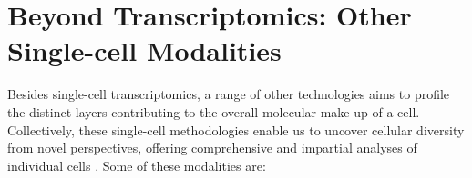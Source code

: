 \section[Beyond Transcriptomics: Other Single-cell Modalities]{Beyond Transcriptomics: Other Single-cell Modalities}
\label{sec:scrna_modalities}

Besides single-cell transcriptomics, a range of other technologies aims to profile the distinct layers contributing to the overall molecular make-up of a cell. Collectively, these single-cell methodologies enable us to uncover cellular diversity from novel perspectives, offering comprehensive and impartial analyses of individual cells \textbf{\cite{stein_single-cell_2021}}. Some of these modalities are:\\



